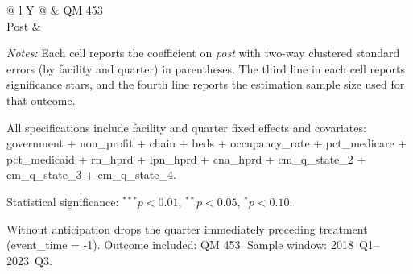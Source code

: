 \documentclass[11pt]{article}
\newcommand{\estn}[4]{\makecell[c]{$#1$ \\ $(#2)$ \\ #3 \\ {\scriptsize N=#4}}}
\begin{document}
\clearpage
\begingroup
\begin{table}[!ht]
\centering
\begin{threeparttable}
\caption{Preliminary TWFE Estimates of \textit{post} on Quality Measure 453 (2018~Q1--2023~Q3, Without anticipation)}
\label{tab:qtwfe-restr18-without}
\small
\setlength{\tabcolsep}{5pt}

\begin{tabularx}{\textwidth}{@{} l Y @{}}
\toprule
 & QM 453 \\
\midrule
Post & \estn{\phantom{-}0.159}{0.181}{}{128,355} \\
\bottomrule
\end{tabularx}

\begin{tablenotes}[flushleft]
\footnotesize
\item \textit{Notes:} Each cell reports the coefficient on \textit{post} with two-way clustered standard errors (by facility and quarter) in parentheses. The third line in each cell reports significance stars, and the fourth line reports the estimation sample size used for that outcome.
\item All specifications include facility and quarter fixed effects and covariates: government + non\_profit + chain + beds + occupancy\_rate + pct\_medicare + pct\_medicaid + rn\_hprd + lpn\_hprd + cna\_hprd + cm\_q\_state\_2 + cm\_q\_state\_3 + cm\_q\_state\_4.
\item Statistical significance: $^{***}p<0.01$, $^{**}p<0.05$, $^{*}p<0.10$.
\item Without anticipation drops the quarter immediately preceding treatment (event\_time = -1). Outcome included: QM 453. Sample window: 2018~Q1--2023~Q3.
\end{tablenotes}
\end{threeparttable}
\end{table}
\endgroup
\end{document}
